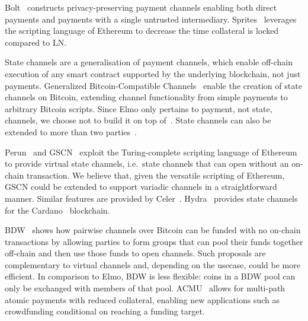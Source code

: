   Bolt~\cite{10.1145/3133956.3134093} constructs privacy-preserving payment
  channels enabling both direct payments and payments with a single untrusted
  intermediary. Sprites~\cite{sprites} leverages the scripting language of
  E\-the\-re\-um to decrease the time collateral is locked compared to LN.

  State channels are a generalisation of payment channels, which enable
  off-chain execution of any smart contract supported by the underlying
  blockchain, not just payments. Generalized Bitcoin-Compatible
  Channels~\cite{DBLP:journals/iacr/AumayrEEFHMMR20} enable the creation of
  state channels on Bitcoin, extending channel functionality from simple
  payments to arbitrary Bitcoin scripts. Since Elmo only pertains to payment,
  not state, channels, we choose not to build it on top
  of~\cite{DBLP:journals/iacr/AumayrEEFHMMR20}. State channels can also be
  extended to more than two
  parties~\cite{DBLP:conf/asiaccs/LiaoZSS22,DBLP:conf/eurocrypt/DziembowskiEFHH19}.

  Perun~\cite{perun} and GSCN~\cite{DBLP:conf/ccs/DziembowskiFH18} exploit the
  Turing-complete scripting language of Ethereum to provide virtual state
  channels, i.e.\ state channels that can open without an on-chain transaction.
  We believe that, given the versatile scripting of Ethereum, GSCN could be
  extended to support variadic channels in a straightforward manner. Similar
  features are provided by Celer~\cite{dong2018celer}.
  Hydra~\cite{cryptoeprint:2020:299} provides state channels for the
  Cardano~\cite{cardano} blockchain.

  BDW~\cite{scalable-funding} shows how pairwise channels over Bitcoin can be
  funded with no on-chain transactions by allowing parties to form groups that
  can pool their funds together off-chain and then use those funds to open
  channels. Such proposals are complementary to virtual channels and, depending
  on the usecase, could be more efficient. In comparison to Elmo, BDW is less
  flexible: coins in a BDW pool can only be exchanged with members of that
  pool. ACMU~\cite{10.1145/3319535.3345666} allows for multi-path atomic
  payments with reduced collateral, enabling new applications such as
  crowdfunding conditional on reaching a funding target.

